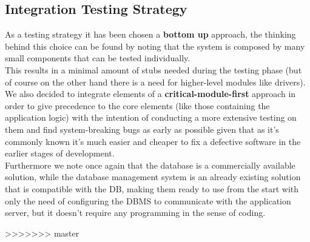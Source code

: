 \subsection{Integration Testing Strategy}
As a testing strategy it has been chosen a \textbf{bottom up} approach, the thinking behind this choice can be found by noting that the system is composed by many small components that can be tested individually.\\
This results in a minimal amount of stubs needed during the testing phase (but of course on the other hand there is a need for higher-level modules like drivers).\\
We also decided to integrate elements of a \textbf{critical-module-first} approach in order to give precedence to the core elements (like those containing the application logic) with the intention of conducting a more extensive testing on them and find system-breaking bugs as early as possible given that as it's commonly known it's much easier and cheaper to fix a defective software in the earlier stages of development.\\
Furthermore we note once again that the database is a commercially available solution, while the database management system is an already existing solution that is compatible with the DB, making them ready to use from the start with only the need of configuring the DBMS to communicate with the application server, but it doesn't require any programming in the sense of coding.








>>>>>>> master
